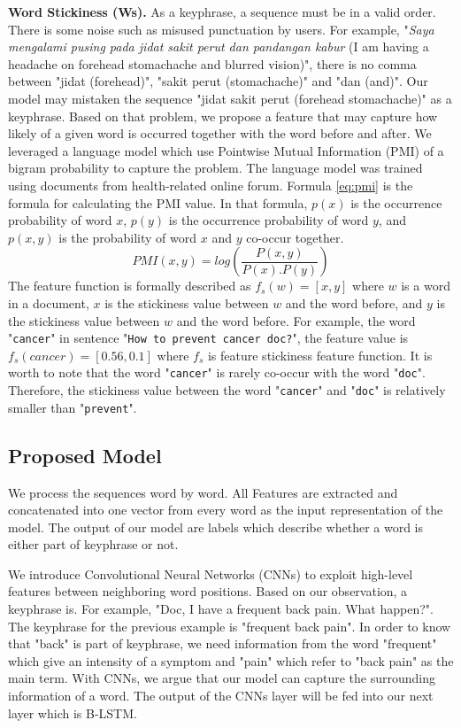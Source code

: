 \documentclass[sigconf]{acmart}
\begin{document}
	
	\textbf{Word Stickiness (Ws).} As a keyphrase, a sequence must be in a valid order. There is some noise such as misused punctuation by users. For example, "\textit{Saya mengalami pusing pada jidat sakit perut dan pandangan kabur} (I am having a headache on forehead stomachache and blurred vision)", there is no comma between "jidat (forehead)", "sakit perut (stomachache)" and "dan (and)". Our model may mistaken the sequence "jidat sakit perut (forehead stomachache)" as a keyphrase. Based on that problem, we propose a feature that may capture how likely of a given word is occurred together with the word before and after. We leveraged a language model which use Pointwise Mutual Information (PMI) of a bigram probability to capture the problem. The language model was trained using documents from health-related online forum. Formula \ref{eq:pmi} is the formula for calculating the PMI value. In that formula, $p(x)$ is the occurrence probability of word $x$, $p(y)$ is the occurrence probability of word $y$, and $p(x, y)$ is the probability of word $x$ and $y$ co-occur together.
	\begin{equation}\label{eq:pmi}
	PMI(x,y)=log(\frac{P(x, y)}{P(x).P(y)})
	\end{equation}
	The feature function is formally described as $f_s(w) = [x, y]$ where $w$ is a word in a document, $x$ is the stickiness value between $w$ and the word before, and $y$ is the stickiness value between $w$ and the word before. For example, the word "\texttt{cancer}" in sentence "\texttt{How to prevent cancer doc?}", the feature value is $f_s(cancer) = [0.56, 0.1]$ where $f_s$ is feature stickiness feature function. It is worth to note that the word "\texttt{cancer}" is rarely co-occur with the word "\texttt{doc}". Therefore, the stickiness value between the word "\texttt{cancer}" and "\texttt{doc}" is relatively smaller than "\texttt{prevent}".
	
	\subsection{Proposed Model}
	We process the sequences word by word. All Features are extracted and concatenated into one vector from every word as the input representation of the model. The output of our model are labels which describe whether a word is either part of keyphrase or not. 
	
	We introduce Convolutional Neural Networks (CNNs) to exploit high-level features between neighboring word positions. Based on our observation, a keyphrase is. For example, "Doc, I have a frequent back pain. What happen?". The keyphrase for the previous example is "frequent back pain". In order to know that "back" is part of keyphrase, we need information from the word "frequent" which give an intensity of a symptom and "pain" which refer to "back pain" as the main term. With CNNs, we argue that our model can capture the surrounding information of a word. The output of the CNNs layer will be fed into our next layer which is B-LSTM.
	
\end{document}
